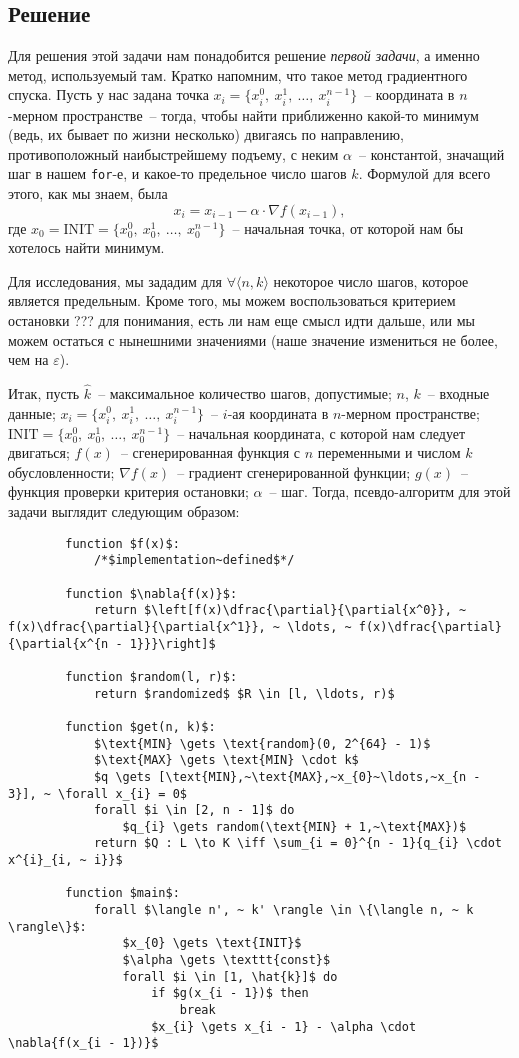 \documentclass[12pt, a4paper, oneside]{article}
\begin{document}
	\subsection*{Решение}
	Для решения этой задачи нам понадобится решение \textit{первой задачи}, а именно метод, используемый там. Кратко напомним, что такое метод градиентного спуска. Пусть у нас задана точка $x_{i} = \{x^0_i, ~ x^1_i, ~ \ldots, ~ x^{n - 1}_i\}$~-- координата в $n$-мерном пространстве~-- тогда, чтобы найти приближенно какой-то минимум (ведь, их бывает по жизни несколько) двигаясь по направлению, противоположный наибыстрейшему подъему, с неким $\alpha$~-- константой, значащий шаг в нашем \texttt{for}-е, и какое-то предельное число шагов $k$. Формулой для всего этого, как мы знаем, была
	\[
		x_{i} = x_{i - 1} - \alpha \cdot \nabla{f(x_{i - 1})},
	\] где $x_{0} = \text{INIT} = \{x^0_0, ~ x^1_0, ~ \ldots, ~ x^{n - 1}_0\}$~-- начальная точка, от которой нам бы хотелось найти минимум.

	Для исследования, мы зададим для $\forall \langle n, k \rangle$ некоторое число шагов, которое является предельным. Кроме того, мы можем воспользоваться критерием остановки ??? для понимания, есть ли нам еще смысл идти дальше, или мы можем остаться с нынешними значениями (наше значение измениться не более, чем на $\varepsilon$).

	Итак, пусть $\hat{k}$~-- максимальное количество шагов, допустимые; $n$, $k$~-- входные данные; $x_{i} = \{x^0_i, ~ x^1_i, ~ \ldots, ~ x^{n - 1}_{i}\}$~-- $i$-ая координата в $n$-мерном пространстве; $\text{INIT} = \{x^0_0, ~ x^1_0, ~ \ldots, ~ x^{n - 1}_0\}$~-- начальная координата, с которой нам следует двигаться; $f(x)$~-- сгенерированная функция с $n$ переменными и числом $k$ обусловленности; $\nabla{f(x)}$~-- градиент сгенерированной функции; $g(x)$~-- функция проверки критерия остановки; $\alpha$~-- шаг. Тогда, псевдо-алгоритм для этой задачи выглядит следующим образом:
	\begin{lstlisting}
		function $f(x)$:
			/*$implementation~defined$*/

		function $\nabla{f(x)}$:
			return $\left[f(x)\dfrac{\partial}{\partial{x^0}}, ~ f(x)\dfrac{\partial}{\partial{x^1}}, ~ \ldots, ~ f(x)\dfrac{\partial}{\partial{x^{n - 1}}}\right]$

		function $random(l, r)$:
			return $randomized$ $R \in [l, \ldots, r)$
		
		function $get(n, k)$:
			$\text{MIN} \gets \text{random}(0, 2^{64} - 1)$
			$\text{MAX} \gets \text{MIN} \cdot k$
			$q \gets [\text{MIN},~\text{MAX},~x_{0}~\ldots,~x_{n - 3}], ~ \forall x_{i} = 0$
			forall $i \in [2, n - 1]$ do
				$q_{i} \gets random(\text{MIN} + 1,~\text{MAX})$
			return $Q : L \to K \iff \sum_{i = 0}^{n - 1}{q_{i} \cdot x^{i}_{i, ~ i}}$

		function $main$:
			forall $\langle n', ~ k' \rangle \in \{\langle n, ~ k \rangle\}$:
				$x_{0} \gets \text{INIT}$
				$\alpha \gets \texttt{const}$
				forall $i \in [1, \hat{k}]$ do
					if $g(x_{i - 1})$ then
						break
					$x_{i} \gets x_{i - 1} - \alpha \cdot \nabla{f(x_{i - 1})}$
	\end{lstlisting}
\end{document}
